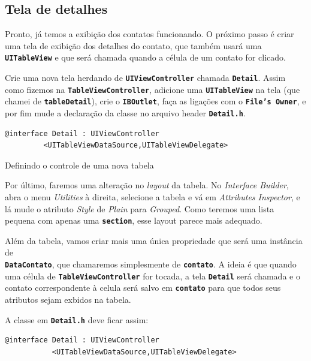 \documentclass[a4paper,12pt,brazil,doubleside]{book}
\begin{document}
\begin{singlespace}
\subsection{Tela de detalhes}


Pronto, já temos a exibição dos contatos funcionando. O próximo passo é criar uma tela de exibição dos detalhes do contato, que também usará uma \texttt{\textbf{UITableView}} e que será chamada quando a célula de um contato for clicado.

Crie uma nova tela herdando de \texttt{\textbf{UIViewController}} chamada \texttt{\textbf{Detail}}. Assim como fizemos na \texttt{\textbf{TableViewController}}, adicione uma \texttt{\textbf{UITableView}} na tela (que chamei de \texttt{\textbf{tableDetail}}), crie o \texttt{\textbf{IBOutlet}}, faça as ligações com o \texttt{\textbf{File's Owner}}, e por fim mude a declaração da classe no arquivo header \texttt{\textbf{Detail.h}}.

\begin{listing}[H]
\begin{verbatim}
@interface Detail : UIViewController
         <UITableViewDataSource,UITableViewDelegate>
\end{verbatim}
\caption{Definindo o controle de uma nova tabela}
\end{listing}


Por último, faremos uma alteração no \emph{layout} da tabela. No \emph{Interface Builder}, abra o menu \emph{Utilities} à direita, selecione a tabela e vá em \emph{Attributes Inspector}, e lá mude o atributo \emph{Style} de \emph{Plain} para \emph{Grouped}. Como teremos uma lista pequena com apenas uma \texttt{\textbf{section}}, esse layout parece mais adequado.

Além da tabela, vamos criar mais uma única propriedade que será uma instância de\\
\texttt{\textbf{DataContato}}, que chamaremos simplesmente de \texttt{\textbf{contato}}. A ideia é que quando uma célula de \texttt{\textbf{TableViewController}} for tocada, a tela \texttt{\textbf{Detail}} será chamada e o contato correspondente à celula será salvo em \texttt{\textbf{contato}} para que todos seus atributos sejam exbidos na tabela.

A classe em \texttt{\textbf{Detail.h}} deve ficar assim:

\begin{listing}[H]
\begin{verbatim}
@interface Detail : UIViewController
           <UITableViewDataSource,UITableViewDelegate>


\end{verbatim}
\end{listing}
\end{singlespace}
\end{document}
